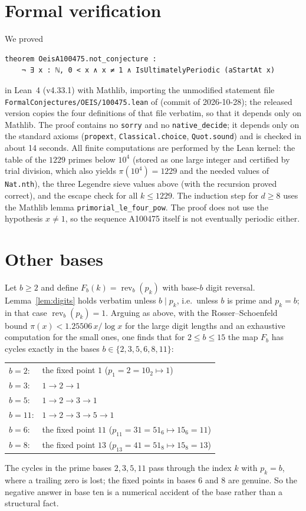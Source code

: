 \documentclass[11pt]{amsart}
\theoremstyle{remark}
\begin{document}
\section{Formal verification}

{\sloppy
We proved
\begin{Verbatim}[fontsize=\small,frame=single]
theorem OeisA100475.not_conjecture :
    ¬ ∃ x : ℕ, 0 < x ∧ x ≠ 1 ∧ IsUltimatelyPeriodic (aStartAt x)
\end{Verbatim}
in Lean~4 (v4.33.1) with Mathlib, importing the unmodified statement file \nolinkurl{FormalConjectures/OEIS/100475.lean} of \cite{FC} (commit of 2026-10-28); the released version copies the four definitions of that file verbatim, so that it depends only on Mathlib.
The proof contains no \texttt{sorry} and no \texttt{native\_decide}; it depends only on the standard axioms (\texttt{propext}, \texttt{Classical.choice}, \texttt{Quot.sound}) and is checked in about 14 seconds.
All finite computations are performed by the Lean kernel: the table of the $1229$ primes below $10^4$ (stored as one large integer and certified by trial division, which also yields $\pi(10^4)=1229$ and the needed values of \texttt{Nat.nth}), the three Legendre sieve values above (with the recursion proved correct), and the escape check for all $k\le 1229$.
The induction step for $d\ge 8$ uses the Mathlib lemma \texttt{primorial\_le\_four\_pow}.
The proof does not use the hypothesis $x\neq1$, so the sequence A100475 itself is not eventually periodic either.\par}

\section{Other bases}

Let $b\ge 2$ and define $F_b(k)=\operatorname{rev}_b(p_k)$ with base-$b$ digit reversal.
Lemma~\ref{lem:digits} holds verbatim unless $b\mid p_k$, i.e.\ unless $b$ is prime and $p_k=b$; in that case $\operatorname{rev}_b(p_k)=1$.
Arguing as above, with the Rosser--Schoenfeld bound $\pi(x)<1.25506\,x/\log x$ \cite{RS} for the large digit lengths and an exhaustive computation for the small ones, one finds that for $2\le b\le 15$ the map $F_b$ has cycles exactly in the bases $b\in\{2,3,5,6,8,11\}$:
\begin{center}
\begin{tabular}{ll}
$b=2$: & the fixed point $1$ \quad ($p_1=2=10_2\mapsto 1$)\\
$b=3$: & $1\to2\to1$\\
$b=5$: & $1\to2\to3\to1$\\
$b=11$: & $1\to2\to3\to5\to1$\\
$b=6$: & the fixed point $11$ \quad ($p_{11}=31=51_6\mapsto 15_6=11$)\\
$b=8$: & the fixed point $13$ \quad ($p_{13}=41=51_8\mapsto 15_8=13$)
\end{tabular}
\end{center}
The cycles in the prime bases $2,3,5,11$ pass through the index $k$ with $p_k=b$, where a trailing zero is lost; the fixed points in bases $6$ and $8$ are genuine.
So the negative answer in base ten is a numerical accident of the base rather than a structural fact.
\end{document}
